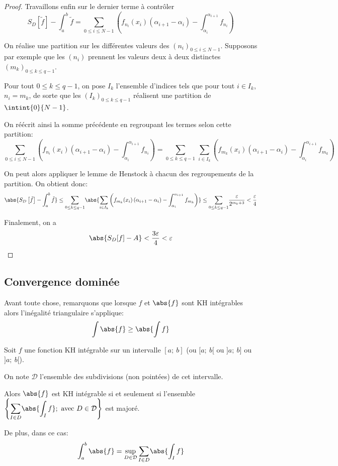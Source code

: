 \begin{proof}
Travaillons enfin sur le dernier terme à contrôler
\[
S_D\left [ \tilde{f}\right ]-\int_a^b \tilde{f} = \displaystyle{\sum \limits_{0 \leq i \leq N-1}} \left (f_{n_i}(x_i) \left ( \alpha_{i+1}-\alpha_i\right ) - \int_{\alpha_i}^{\alpha_{i+1}} f_{n_i}\right )
\]

On réalise une partition sur les différentes valeurs des $(n_i)_{0 \leq i \leq N-1}$. Supposons par exemple que les $(n_i)$ prennent les valeurs deux à deux distinctes $(m_k)_{0 \leq k \leq q-1}$. 

Pour tout $0 \leq k \leq q-1$, on pose $I_k$ l'ensemble d'indices tels que pour tout $i \in I_k$, $n_i = m_k$, de sorte que les $(I_k)_{0 \leq k \leq q-1}$ réalisent une partition de $\intint{0}{N-1}$.

On réécrit ainsi la somme précédente en regroupant les termes selon cette partition:
\[
\displaystyle{\sum \limits_{0 \leq i \leq N-1}} \left (f_{n_i}(x_i) \left ( \alpha_{i+1}-\alpha_i\right ) - \int_{\alpha_i}^{\alpha_{i+1}} f_{n_i}\right ) = \displaystyle{\sum \limits_{0 \leq k \leq q-1}} \, \sum \limits_{i \in I_k} \left (f_{m_k}(x_i) \left ( \alpha_{i+1}-\alpha_i\right ) - \int_{\alpha_i}^{\alpha_{i+1}} f_{m_k}\right )
\]

On peut alors appliquer le lemme de Henstock à chacun des regroupements de la partition. On obtient donc:
\[
\abs{S_D\left [ \tilde{f}\right ]-\int_a^b \tilde{f}} \leq \displaystyle{\sum \limits_{0 \leq k \leq q-1}} \abs{\sum \limits_{i \in I_k} \left (f_{m_k}(x_i) \left ( \alpha_{i+1}-\alpha_i\right ) - \int_{\alpha_i}^{\alpha_{i+1}} f_{m_k}\right )} \leq \displaystyle{\sum \limits_{0 \leq k \leq q-1}} \dfrac{\varepsilon}{2^{m_k+3}} < \dfrac{\varepsilon}{4}
\]

Finalement, on a 
\[
\abs{S_D[f]-A} < \dfrac{3\varepsilon}{4} < \varepsilon
\]
\end{proof}


\subsection{Convergence dominée}

Avant toute chose, remarquons que lorsque $f$ et $\abs{f}$ sont KH intégrables alors l'inégalité triangulaire s'applique:
\[
\int \abs{f} \geq \abs{\int f}
\]

\begin{lem}
Soit $f$ une fonction KH intégrable sur un intervalle $[a;~b]$ (ou $[a;~b[$ ou $]a;~b]$ ou $]a;~b[$).

On note $\mathcal{D}$ l'ensemble des subdivisions (non pointées) de cet intervalle.

Alors $\abs{f}$ est KH intégrable si et seulement si l'ensemble $\left \{ \displaystyle{\sum \limits_{I \in D}} \abs{\int_I f}; \text{ avec }D  \in \mathcal{D}\right \}$ est majoré.

De plus, dans ce cas:
\[
\int_a^b \abs{f} = \sup \limits_{D \in \mathcal{D}} \displaystyle{\sum \limits_{I \in D}} \abs{\int_I f}
\]
\end{lem}

